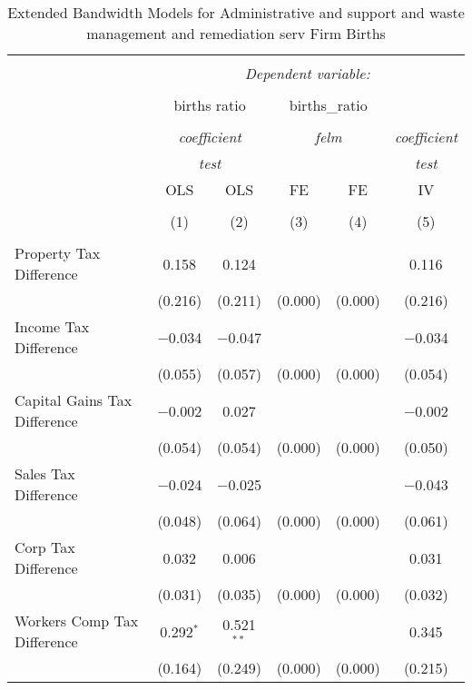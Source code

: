 
\begin{table}[!htbp] \centering 
  \caption{Extended Bandwidth Models for  Administrative and support and waste management and remediation serv Firm Births} 
  \label{} 
\begin{tabular}{@{\extracolsep{5pt}}lccccc} 
\\[-1.8ex]\hline 
\hline \\[-1.8ex] 
 & \multicolumn{5}{c}{\textit{Dependent variable:}} \\ 
\cline{2-6} 
\\[-1.8ex] & \multicolumn{2}{c}{births ratio} & \multicolumn{2}{c}{births\_ratio} &   \\ 
\\[-1.8ex] & \multicolumn{2}{c}{\textit{coefficient}} & \multicolumn{2}{c}{\textit{felm}} & \textit{coefficient} \\ 
 & \multicolumn{2}{c}{\textit{test}} & \multicolumn{2}{c}{\textit{}} & \textit{test} \\ 
 & OLS & OLS & FE & FE & IV \\ 
\\[-1.8ex] & (1) & (2) & (3) & (4) & (5)\\ 
\hline \\[-1.8ex] 
 Property Tax Difference & 0.158 & 0.124 &  &  & 0.116 \\ 
  & (0.216) & (0.211) & (0.000) & (0.000) & (0.216) \\ 
  Income Tax Difference & $-$0.034 & $-$0.047 &  &  & $-$0.034 \\ 
  & (0.055) & (0.057) & (0.000) & (0.000) & (0.054) \\ 
  Capital Gains Tax Difference & $-$0.002 & 0.027 &  &  & $-$0.002 \\ 
  & (0.054) & (0.054) & (0.000) & (0.000) & (0.050) \\ 
  Sales Tax Difference & $-$0.024 & $-$0.025 &  &  & $-$0.043 \\ 
  & (0.048) & (0.064) & (0.000) & (0.000) & (0.061) \\ 
  Corp Tax Difference & 0.032 & 0.006 &  &  & 0.031 \\ 
  & (0.031) & (0.035) & (0.000) & (0.000) & (0.032) \\ 
  Workers Comp Tax Difference & 0.292$^{*}$ & 0.521$^{**}$ &  &  & 0.345 \\ 
  & (0.164) & (0.249) & (0.000) & (0.000) & (0.215) \\ 

\end{tabular}
\end{table}
